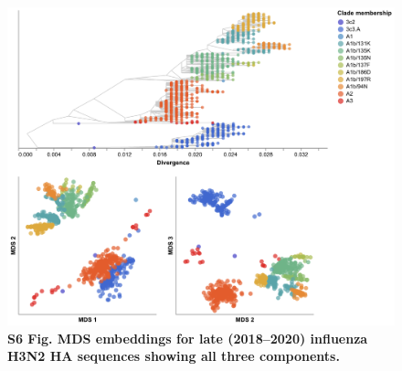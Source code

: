 \documentclass[10pt,letterpaper]{article}
\begin{document}
\begin{figure}[!h]
\includegraphics[width=\columnwidth]{figures/flu-2018-2020-mds-by-clade.png}
\caption*{{\bf S6 Fig. MDS embeddings for late (2018--2020) influenza H3N2 HA sequences showing all three components.}}
\end{figure}
\end{document}
